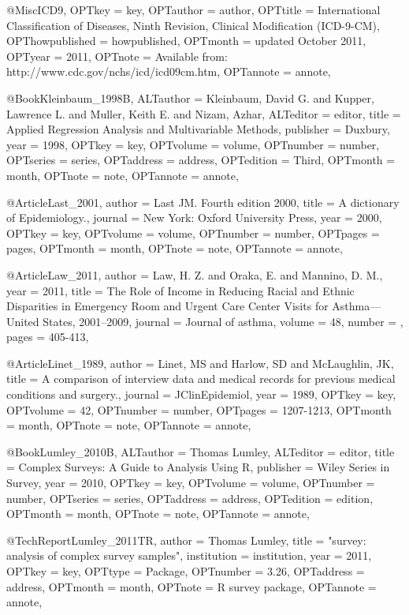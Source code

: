 {{{@Misc{ICD9,
OPTkey = {key},
OPTauthor = {author},
OPTtitle = {International Classification of Diseases, Ninth Revision, Clinical Modification (ICD-9-CM)},
OPThowpublished = {howpublished},
OPTmonth = {updated October 2011},
OPTyear = {2011},
OPTnote = {Available from: http://www.cdc.gov/nchs/icd/icd09cm.htm},
OPTannote = {annote},
}




@Book{Kleinbaum_1998B,
ALTauthor = {Kleinbaum, David G. and Kupper, Lawrence L. and
Muller, Keith E. and Nizam, Azhar},
ALTeditor = {editor},
title = {Applied Regression Analysis and Multivariable 
Methods},
publisher = {Duxbury},
year = {1998},
OPTkey = {key},
OPTvolume = {volume},
OPTnumber = {number},
OPTseries = {series},
OPTaddress = {address},
OPTedition = {Third},
OPTmonth = {month},
OPTnote = {note},
OPTannote = {annote},
}




@Article{Last_2001,
author = {Last JM. Fourth edition 2000},
title = {A dictionary of Epidemiology.},
journal = {New York: Oxford University Press},
year = {2000},
OPTkey = {key},
OPTvolume = {volume},
OPTnumber = {number},
OPTpages = {pages},
OPTmonth = {month},
OPTnote = {note},
OPTannote = {annote},
}

@Article{Law_2011,
  author = {Law, H. Z. and Oraka, E. and Mannino, D. M.},
  year = {2011},
  title = {The Role of Income in Reducing Racial and Ethnic Disparities in Emergency Room and Urgent Care Center Visits for Asthma—United States, 2001–2009},
  journal = {Journal of asthma},
  volume =  {48},
  number = {},
  pages = {405-413},
}

@Article{Linet_1989,
author = {Linet, MS and Harlow, SD and McLaughlin, JK},
title = {A comparison of interview data and medical records for previous medical conditions and surgery.},
journal = {JClinEpidemiol},
year = {1989},
OPTkey = {key},
OPTvolume = {42},
OPTnumber = {number},
OPTpages = {1207-1213},
OPTmonth = {month},
OPTnote = {note},
OPTannote = {annote},
}


@Book{Lumley_2010B,
ALTauthor = {Thomas Lumley},
ALTeditor = {editor},
title = {Complex Surveys: A Guide to Analysis Using R},
publisher = {Wiley Series in Survey},
year = {2010},
OPTkey = {key},
OPTvolume = {volume},
OPTnumber = {number},
OPTseries = {series},
OPTaddress = {address},
OPTedition = {edition},
OPTmonth = {month},
OPTnote = {note},
OPTannote = {annote},
}

@TechReport{Lumley_2011TR,
author = {Thomas Lumley},
title = {"survey: analysis of complex survey samples"},
institution = {institution},
year = {2011},
OPTkey = {key},
OPTtype = {Package},
OPTnumber = {3.26},
OPTaddress = {address},
OPTmonth = {month},
OPTnote = {R survey package},
OPTannote = {annote},
}


}}}
